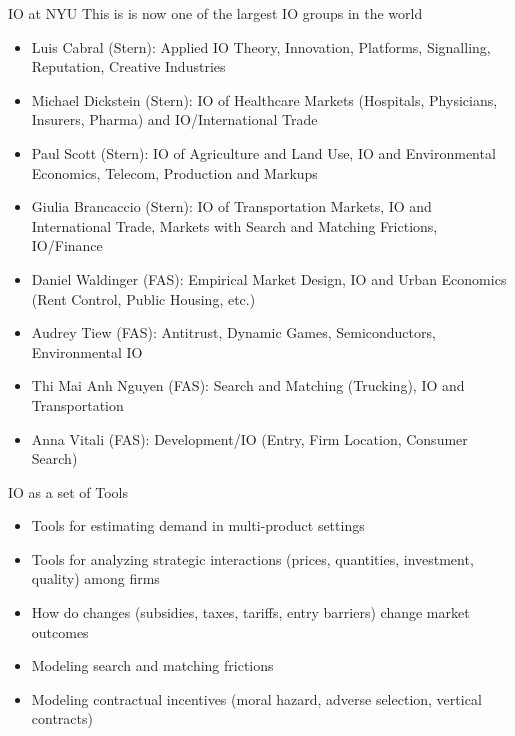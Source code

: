 \begin{frame}{IO at NYU}
This is is now one of the largest IO groups in the world
\begin{itemize}
    \item Luis Cabral (Stern): Applied IO Theory, Innovation, Platforms, Signalling, Reputation, Creative Industries
    \item Michael Dickstein (Stern): IO of Healthcare Markets (Hospitals, Physicians, Insurers, Pharma) and IO/International Trade
    \item Paul Scott (Stern): IO of Agriculture and Land Use, IO and Environmental Economics, Telecom, Production and Markups
    \item Giulia Brancaccio (Stern): IO of Transportation Markets, IO and International Trade, Markets with Search and Matching Frictions, IO/Finance
    \item Daniel Waldinger (FAS): Empirical Market Design, IO and Urban Economics (Rent Control, Public Housing, etc.)
    \item Audrey Tiew (FAS): Antitrust, Dynamic Games, Semiconductors, Environmental IO
    \item Thi Mai Anh Nguyen (FAS): Search and Matching (Trucking), IO and Transportation
    \item Anna Vitali (FAS): Development/IO (Entry, Firm Location, Consumer Search)
\end{itemize}
\end{frame}

\begin{frame}{IO as a set of Tools}
\begin{itemize}
    \item Tools for estimating demand in multi-product settings
    \item Tools for analyzing strategic interactions (prices, quantities, investment, quality) among firms
    \item How do changes (subsidies, taxes, tariffs, entry barriers) change market outcomes
    \item Modeling search and matching frictions
    \item Modeling contractual incentives (moral hazard, adverse selection, vertical contracts)
\end{itemize}
\end{frame}



